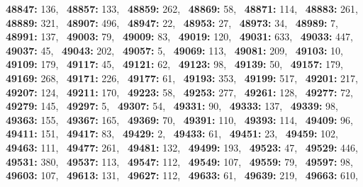 \textbf{48847:} 136,\allowbreak~ 
\textbf{48857:} 133,\allowbreak~ 
\textbf{48859:} 262,\allowbreak~ 
\textbf{48869:} 58,\allowbreak~ 
\textbf{48871:} 114,\allowbreak~ 
\textbf{48883:} 261,\allowbreak~ 
\textbf{48889:} 321,\allowbreak~ 
\textbf{48907:} 496,\allowbreak~ 
\textbf{48947:} 22,\allowbreak~ 
\textbf{48953:} 27,\allowbreak~ 
\textbf{48973:} 34,\allowbreak~ 
\textbf{48989:} 7,\allowbreak~ 
\textbf{48991:} 137,\allowbreak~ 
\textbf{49003:} 79,\allowbreak~ 
\textbf{49009:} 83,\allowbreak~ 
\textbf{49019:} 120,\allowbreak~ 
\textbf{49031:} 633,\allowbreak~ 
\textbf{49033:} 447,\allowbreak~ 
\textbf{49037:} 45,\allowbreak~ 
\textbf{49043:} 202,\allowbreak~ 
\textbf{49057:} 5,\allowbreak~ 
\textbf{49069:} 113,\allowbreak~ 
\textbf{49081:} 209,\allowbreak~ 
\textbf{49103:} 10,\allowbreak~ 
\textbf{49109:} 179,\allowbreak~ 
\textbf{49117:} 45,\allowbreak~ 
\textbf{49121:} 62,\allowbreak~ 
\textbf{49123:} 98,\allowbreak~ 
\textbf{49139:} 50,\allowbreak~ 
\textbf{49157:} 179,\allowbreak~ 
\textbf{49169:} 268,\allowbreak~ 
\textbf{49171:} 226,\allowbreak~ 
\textbf{49177:} 61,\allowbreak~ 
\textbf{49193:} 353,\allowbreak~ 
\textbf{49199:} 517,\allowbreak~ 
\textbf{49201:} 217,\allowbreak~ 
\textbf{49207:} 124,\allowbreak~ 
\textbf{49211:} 170,\allowbreak~ 
\textbf{49223:} 58,\allowbreak~ 
\textbf{49253:} 277,\allowbreak~ 
\textbf{49261:} 128,\allowbreak~ 
\textbf{49277:} 72,\allowbreak~ 
\textbf{49279:} 145,\allowbreak~ 
\textbf{49297:} 5,\allowbreak~ 
\textbf{49307:} 54,\allowbreak~ 
\textbf{49331:} 90,\allowbreak~ 
\textbf{49333:} 137,\allowbreak~ 
\textbf{49339:} 98,\allowbreak~ 
\textbf{49363:} 155,\allowbreak~ 
\textbf{49367:} 165,\allowbreak~ 
\textbf{49369:} 70,\allowbreak~ 
\textbf{49391:} 110,\allowbreak~ 
\textbf{49393:} 114,\allowbreak~ 
\textbf{49409:} 96,\allowbreak~ 
\textbf{49411:} 151,\allowbreak~ 
\textbf{49417:} 83,\allowbreak~ 
\textbf{49429:} 2,\allowbreak~ 
\textbf{49433:} 61,\allowbreak~ 
\textbf{49451:} 23,\allowbreak~ 
\textbf{49459:} 102,\allowbreak~ 
\textbf{49463:} 111,\allowbreak~ 
\textbf{49477:} 261,\allowbreak~ 
\textbf{49481:} 132,\allowbreak~ 
\textbf{49499:} 193,\allowbreak~ 
\textbf{49523:} 47,\allowbreak~ 
\textbf{49529:} 446,\allowbreak~ 
\textbf{49531:} 380,\allowbreak~ 
\textbf{49537:} 113,\allowbreak~ 
\textbf{49547:} 112,\allowbreak~ 
\textbf{49549:} 107,\allowbreak~ 
\textbf{49559:} 79,\allowbreak~ 
\textbf{49597:} 98,\allowbreak~ 
\textbf{49603:} 107,\allowbreak~ 
\textbf{49613:} 131,\allowbreak~ 
\textbf{49627:} 112,\allowbreak~ 
\textbf{49633:} 61,\allowbreak~ 
\textbf{49639:} 219,\allowbreak~ 
\textbf{49663:} 610,\allowbreak~ 

